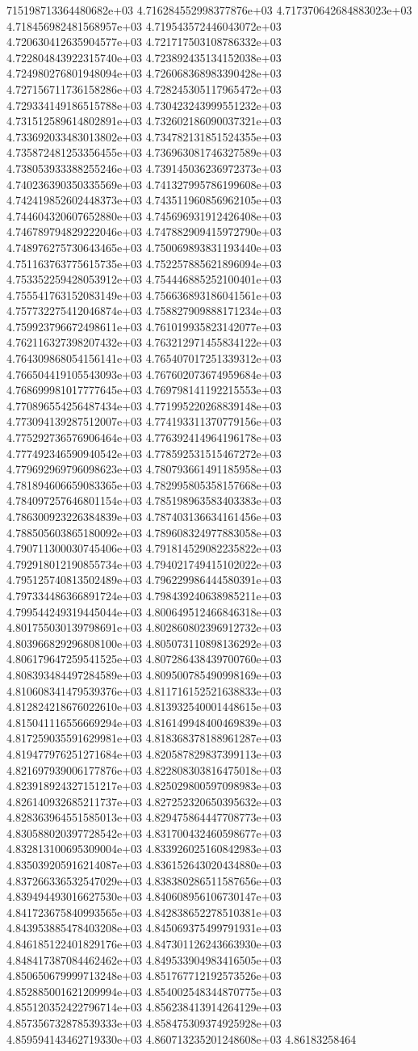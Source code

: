 715198713364480682e+03	4.716284552998377876e+03	4.717370642684883023e+03	4.718456982481568957e+03	4.719543572446043072e+03	4.720630412635904577e+03	4.721717503108786332e+03	4.722804843922315740e+03	4.723892435134152038e+03	4.724980276801948094e+03	4.726068368983390428e+03	4.727156711736158286e+03	4.728245305117965472e+03	4.729334149186515788e+03	4.730423243999551232e+03	4.731512589614802891e+03	4.732602186090037321e+03	4.733692033483013802e+03	4.734782131851524355e+03	4.735872481253356455e+03	4.736963081746327589e+03	4.738053933388255246e+03	4.739145036236972373e+03	4.740236390350335569e+03	4.741327995786199608e+03	4.742419852602448373e+03	4.743511960856962105e+03	4.744604320607652880e+03	4.745696931912426408e+03	4.746789794829222046e+03	4.747882909415972790e+03	4.748976275730643465e+03	4.750069893831193440e+03	4.751163763775615735e+03	4.752257885621896094e+03	4.753352259428053912e+03	4.754446885252100401e+03	4.755541763152083149e+03	4.756636893186041561e+03	4.757732275412046874e+03	4.758827909888171234e+03	4.759923796672498611e+03	4.761019935823142077e+03	4.762116327398207432e+03	4.763212971455834122e+03	4.764309868054156141e+03	4.765407017251339312e+03	4.766504419105543093e+03	4.767602073674959684e+03	4.768699981017777645e+03	4.769798141192215553e+03	4.770896554256487434e+03	4.771995220268839148e+03	4.773094139287512007e+03	4.774193311370779156e+03	4.775292736576906464e+03	4.776392414964196178e+03	4.777492346590940542e+03	4.778592531515467272e+03	4.779692969796098623e+03	4.780793661491185958e+03	4.781894606659083365e+03	4.782995805358157668e+03	4.784097257646801154e+03	4.785198963583403383e+03	4.786300923226384839e+03	4.787403136634161456e+03	4.788505603865180092e+03	4.789608324977883058e+03	4.790711300030745406e+03	4.791814529082235822e+03	4.792918012190855734e+03	4.794021749415102022e+03	4.795125740813502489e+03	4.796229986444580391e+03	4.797334486366891724e+03	4.798439240638985211e+03	4.799544249319445044e+03	4.800649512466846318e+03	4.801755030139798691e+03	4.802860802396912732e+03	4.803966829296808100e+03	4.805073110898136292e+03	4.806179647259541525e+03	4.807286438439700760e+03	4.808393484497284589e+03	4.809500785490998169e+03	4.810608341479539376e+03	4.811716152521638833e+03	4.812824218676022610e+03	4.813932540001448615e+03	4.815041116556669294e+03	4.816149948400469839e+03	4.817259035591629981e+03	4.818368378188961287e+03	4.819477976251271684e+03	4.820587829837399113e+03	4.821697939006177876e+03	4.822808303816475018e+03	4.823918924327151217e+03	4.825029800597098983e+03	4.826140932685211737e+03	4.827252320650395632e+03	4.828363964551585013e+03	4.829475864447708773e+03	4.830588020397728542e+03	4.831700432460598677e+03	4.832813100695309004e+03	4.833926025160842983e+03	4.835039205916214087e+03	4.836152643020434880e+03	4.837266336532547029e+03	4.838380286511587656e+03	4.839494493016627530e+03	4.840608956106730147e+03	4.841723675840993565e+03	4.842838652278510381e+03	4.843953885478403208e+03	4.845069375499791931e+03	4.846185122401829176e+03	4.847301126243663930e+03	4.848417387084462462e+03	4.849533904983416505e+03	4.850650679999713248e+03	4.851767712192573526e+03	4.852885001621209994e+03	4.854002548344870775e+03	4.855120352422796714e+03	4.856238413914264129e+03	4.857356732878539333e+03	4.858475309374925928e+03	4.859594143462719330e+03	4.860713235201248608e+03	4.86183258464